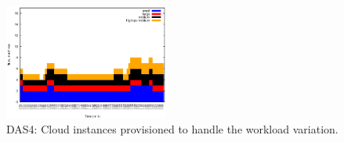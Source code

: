 \begin{figure}[htb]
\begin{minipage}[b]{0.20\linewidth}
	\end{minipage}
\begin{minipage}[b]{0.20\linewidth}
		\vspace{-3mm}
		\includegraphics[width=\linewidth,height=3.8cm]{images/exps2011/high/das/inst_type_machines.eps}
	\end{minipage}
\vspace{-5mm}
\caption{DAS4: Cloud instances provisioned to handle the workload variation.}
\label{fig:DAS4Instances}
\end{figure}



